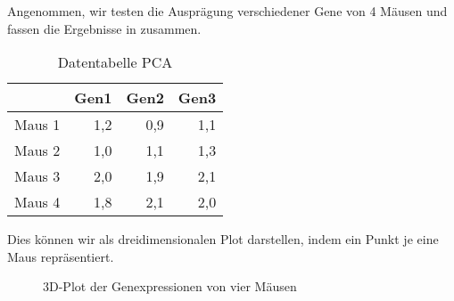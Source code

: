 Angenommen, wir testen die Ausprägung verschiedener Gene von 4 Mäusen und fassen die Ergebnisse in  zusammen.
\begin{table}[tbh]
    \centering
    \caption{Datentabelle PCA}\label{tbl:intuitionpca}
    \begin{tabular}{lrrr}  
        \toprule  
        & Gen1 & Gen2 & Gen3 \\
        \midrule
        Maus 1 & 1,2 & 0,9 & 1,1 \\
        Maus 2 & 1,0 & 1,1 & 1,3 \\
        Maus 3 & 2,0 & 1,9 & 2,1 \\
        Maus 4 & 1,8 & 2,1 & 2,0 \\
        \bottomrule
    \end{tabular}
\end{table}
Dies können wir als dreidimensionalen Plot darstellen, indem ein Punkt je eine Maus repräsentiert.
\begin{figure}[h]
    \centering
    \caption{3D-Plot der Genexpressionen von vier Mäusen}
\end{figure}
